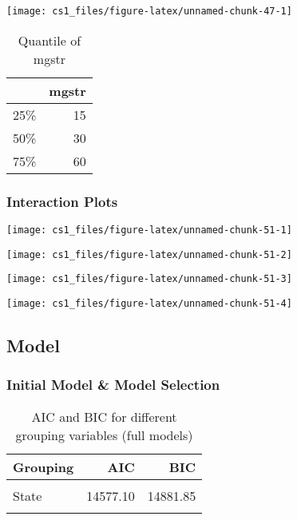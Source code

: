 \documentclass[
  11pt,
]{article}
\begin{document}
\begin{center}\texttt{[image: cs1\_files/figure-latex/unnamed-chunk-47-1]} \end{center}

\begin{table}

\caption{\label{tab:unnamed-chunk-49}Quantile of mgstr}
\centering
\begin{tabular}[t]{l|r}
\hline
  & mgstr\\
\hline
25\% & 15\\
\hline
50\% & 30\\
\hline
75\% & 60\\
\hline
\end{tabular}
\end{table}

\hypertarget{interaction-plots}{%
\subsubsection{Interaction Plots}\label{interaction-plots}}

\begin{center}\texttt{[image: cs1\_files/figure-latex/unnamed-chunk-51-1]} \end{center}

\begin{center}\texttt{[image: cs1\_files/figure-latex/unnamed-chunk-51-2]} \end{center}

\begin{center}\texttt{[image: cs1\_files/figure-latex/unnamed-chunk-51-3]} \end{center}

\begin{center}\texttt{[image: cs1\_files/figure-latex/unnamed-chunk-51-4]} \end{center}

\hypertarget{model-1}{%
\subsection{Model}\label{model-1}}

\hypertarget{initial-model-model-selection-1}{%
\subsubsection{Initial Model \& Model
Selection}\label{initial-model-model-selection-1}}

\begin{table}[!h]

\caption{\label{tab:unnamed-chunk-52}AIC and BIC for different grouping variables (full models)}
\centering
\begin{tabular}[t]{l|r|r}
\hline
Grouping & AIC & BIC\\
\hline
\cellcolor{gray!6}{City} & \cellcolor{gray!6}{14627.21} & \cellcolor{gray!6}{14931.96}\\
\hline
State & 14577.10 & 14881.85\\
\hline
\cellcolor{gray!6}{Region} & \cellcolor{gray!6}{14610.16} & \cellcolor{gray!6}{14914.91}\\
\hline
\end{tabular}
\end{table}
\end{document}
